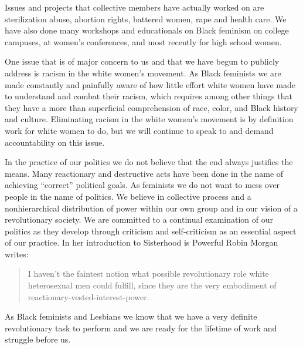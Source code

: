 \documentclass{article}
\begin{document}
Issues and projects that collective members have actually worked on are
sterilization abuse, abortion rights, battered women, rape and health care. We
have also done many workshops and educationals on Black feminism on college
campuses, at women's conferences, and most recently for high school women.

One issue that is of major concern to us and that we have begun to publicly
address is racism in the white women's movement. As Black feminists we are made
constantly and painfully aware of how little effort white women have made to
understand and combat their racism, which requires among other things that they
have a more than superficial comprehension of race, color, and Black history
and culture. Eliminating racism in the white women's movement is by definition
work for white women to do, but we will continue to speak to and demand
accountability on this issue.

In the practice of our politics we do not believe that the end always justifies
the means. Many reactionary and destructive acts have been done in the name of
achieving ``correct'' political goals. As feminists we do not want to mess over
people in the name of politics. We believe in collective process and a
nonhierarchical distribution of power within our own group and in our vision of
a revolutionary society. We are committed to a continual examination of our
politics as they develop through criticism and self-criticism as an essential
aspect of our practice. In her introduction to Sisterhood is Powerful Robin
Morgan writes:

\begin{quote}
	I haven't the faintest notion what possible revolutionary role white
	heterosexual men could fulfill, since they are the very embodiment of
	reactionary-vested-interest-power.
\end{quote}

As Black feminists and Lesbians we know that we have a very definite
revolutionary task to perform and we are ready for the lifetime of work and
struggle before us.
\end{document}
